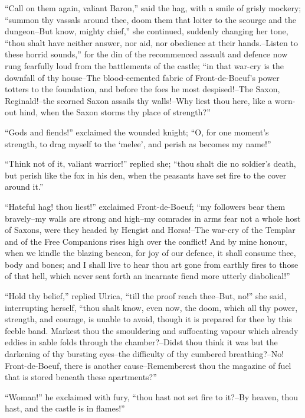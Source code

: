``Call on them again, valiant Baron,'' said the hag, with a smile of
grisly mockery; ``summon thy vassals around thee, doom them that loiter
to the scourge and the dungeon--But know, mighty chief,'' she continued,
suddenly changing her tone, ``thou shalt have neither answer, nor aid,
nor obedience at their hands.--Listen to these horrid sounds,'' for the
din of the recommenced assault and defence now rung fearfully loud from
the battlements of the castle; ``in that war-cry is the downfall of thy
house--The blood-cemented fabric of Front-de-Boeuf's power totters to
the foundation, and before the foes he most despised!--The Saxon,
Reginald!--the scorned Saxon assails thy walls!--Why liest thou here,
like a worn-out hind, when the Saxon storms thy place of strength?''

``Gods and fiends!'' exclaimed the wounded knight; ``O, for one moment's
strength, to drag myself to the `melee', and perish as becomes my
name!''

``Think not of it, valiant warrior!'' replied she; ``thou shalt die no
soldier's death, but perish like the fox in his den, when the peasants
have set fire to the cover around it.''

``Hateful hag! thou liest!'' exclaimed Front-de-Boeuf; ``my followers
bear them bravely--my walls are strong and high--my comrades in arms
fear not a whole host of Saxons, were they headed by Hengist and
Horsa!--The war-cry of the Templar and of the Free Companions rises high
over the conflict! And by mine honour, when we kindle the blazing
beacon, for joy of our defence, it shall consume thee, body and bones;
and I shall live to hear thou art gone from earthly fires to those of
that hell, which never sent forth an incarnate fiend more utterly
diabolical!''

``Hold thy belief,'' replied Ulrica, ``till the proof reach thee--But,
no!'' she said, interrupting herself, ``thou shalt know, even now, the
doom, which all thy power, strength, and courage, is unable to avoid,
though it is prepared for thee by this feeble band. Markest thou the
smouldering and suffocating vapour which already eddies in sable folds
through the chamber?--Didst thou think it was but the darkening of thy
bursting eyes--the difficulty of thy cumbered breathing?--No!
Front-de-Boeuf, there is another cause--Rememberest thou the magazine of
fuel that is stored beneath these apartments?''

``Woman!'' he exclaimed with fury, ``thou hast not set fire to it?--By
heaven, thou hast, and the castle is in flames!''

